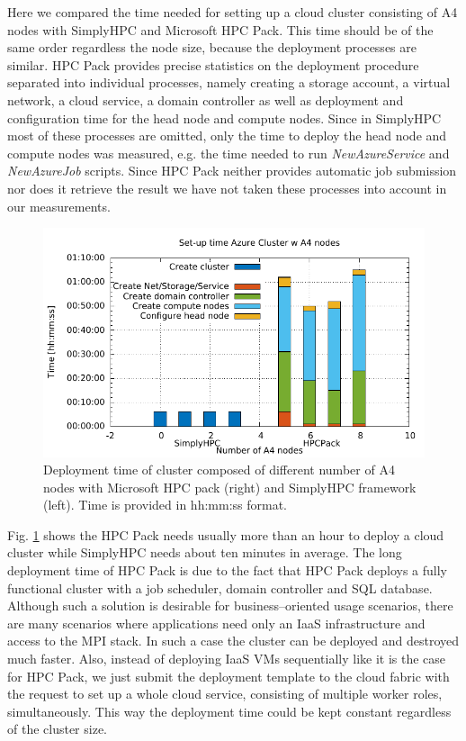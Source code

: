 \documentclass[3p,times]{elsarticle}
\begin{document}
Here we compared the time needed for setting up a cloud cluster consisting of A4 nodes with SimplyHPC and Microsoft HPC Pack. This time should be of the same order regardless the node size, because the deployment processes are similar. HPC Pack provides precise statistics on the deployment procedure separated into individual processes, namely creating a storage account, a virtual network, a cloud service, a domain controller as well as deployment and configuration time for the head node and compute nodes. Since in SimplyHPC most of these processes are omitted, only the time to deploy the head node and compute nodes was measured, e.g. the time needed to run \textit{NewAzureService} and \textit{NewAzureJob} scripts. Since HPC Pack neither provides automatic job submission nor does it retrieve the result we have not taken these processes into account in our measurements. 


\begin{figure}[h]
\centering
	\includegraphics[width=.6\linewidth]{gplt-creation-simplyvshpc}
	\caption{Deployment time of cluster composed of different number of A4 nodes with Microsoft HPC pack (right) and SimplyHPC framework (left). Time is provided in hh:mm:ss format.}
	\label{fig:deployTime}
\end{figure}

Fig. \ref{fig:deployTime} shows the HPC Pack needs usually more than an hour to deploy a cloud cluster while SimplyHPC needs about ten minutes in average. The long deployment time of HPC Pack is due to the fact that HPC Pack deploys a fully functional cluster with a job scheduler, domain controller and SQL database. Although such a solution is desirable for business--oriented usage scenarios, there are many scenarios where applications need only an IaaS infrastructure and access to the MPI stack. In such a case the cluster can be deployed and destroyed much faster. Also, instead of deploying IaaS VMs sequentially like it is the case for HPC Pack, we just submit the deployment template to the cloud fabric with the request to set up a whole cloud service, consisting of multiple worker roles, simultaneously. This way the deployment time could be kept constant regardless of the cluster size.
\end{document}
